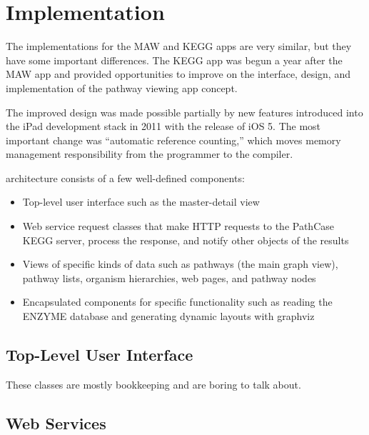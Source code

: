 \section{Implementation}
\label{sect:kegg_implementation}

The implementations for the MAW and KEGG apps are very similar, but they have
some important differences. The KEGG app was begun a year after the MAW app and
provided opportunities to improve on the interface, design, and implementation
of the pathway viewing app concept.

The improved design was made possible partially by new features introduced into
the iPad development stack in 2011 with the release of iOS 5. The most important
change was ``automatic reference counting,'' which moves memory management
responsibility from the programmer to the compiler. 

\keggappp architecture consists of a few well-defined components:

\begin{itemize}

    \item Top-level user interface such as the master-detail view
    
    \item Web service request classes that make HTTP requests to the PathCase
        KEGG server, process the response, and notify other objects of the
        results

    \item Views of specific kinds of data such as pathways (the main graph
        view), pathway lists, organism hierarchies, web pages, and pathway nodes

    \item Encapsulated components for specific functionality such as reading the
        ENZYME database and generating dynamic layouts with graphviz

\end{itemize}

\subsection{Top-Level User Interface}
\label{sect:kegg_impl_top_level_ui}

These classes are mostly bookkeeping and are boring to talk about.

\subsection{Web Services}
\label{sect:kegg_impl_web_services}

